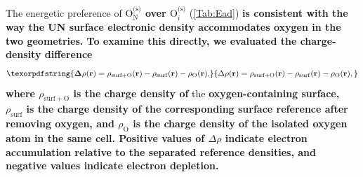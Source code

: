 \documentclass[preprint,12pt,sort&compress]{elsarticle}
\newcommand{\?}{\stackrel{?}{=}}
\providecommand{\DIFaddtex}[1]{{\bf #1}} %
\providecommand{\DIFdeltex}[1]{} %
\providecommand{\DIFaddbegin}{\protect\color{blue}} %
\providecommand{\DIFaddend}{\protect\color{black}} %
\providecommand{\DIFdelbegin}{\protect\color{red}} %
\providecommand{\DIFdelend}{\protect\color{black}} %
\providecommand{\DIFadd}[1]{\texorpdfstring{\DIFaddtex{#1}}{#1}} %
\providecommand{\DIFdel}[1]{\texorpdfstring{\DIFdeltex{#1}}{}} %
\begin{document}
\DIFaddend The energetic preference of \DIFdelbegin \DIFdel{$\mathrm{O_N^{(s)}}$ over $\mathrm{O}_i^{\mathrm{(s)}}$ }\DIFdelend \DIFaddbegin \DIFadd{$\mathrm{O}_{\mathrm{N}}^{\text{(s)}}$ over $\mathrm{O}_i^{\text{(s)}}$ }\DIFaddend (\cref{Tab:Ead}) \DIFdelbegin \DIFdel{can be understood from the electronic structure analyses of oxygen on UN surfaces reported in ~\cite{Bocharov2011JNM, Zhukovskii2009SS, Zhukovskii2009JNM}. In }\DIFdelend \DIFaddbegin \DIFadd{is consistent with the way the UN surface electronic density accommodates oxygen in the two geometries. To examine this directly, we evaluated the charge-density difference
}\begin{equation}
\DIFadd{\Delta\rho(\mathbf{r}) = \rho_{\mathrm{surf+O}}(\mathbf{r}) - \rho_{\mathrm{surf}}(\mathbf{r}) - \rho_{\mathrm{O}}(\mathbf{r}),
\label{Eq:drho}
}\end{equation}
\DIFadd{where $\rho_{\mathrm{surf+O}}$ is the charge density of }\DIFaddend the \DIFdelbegin \DIFdel{NaCl structure, a }\DIFdelend \DIFaddbegin \DIFadd{oxygen-containing surface, $\rho_{\mathrm{surf}}$ is the charge density of the corresponding surface reference after removing oxygen, and $\rho_{\mathrm{O}}$ is the charge density of the isolated oxygen atom in the same cell. Positive values of $\Delta\rho$ indicate electron accumulation relative to the separated reference densities, and negative values indicate electron depletion.
}
\end{document}
